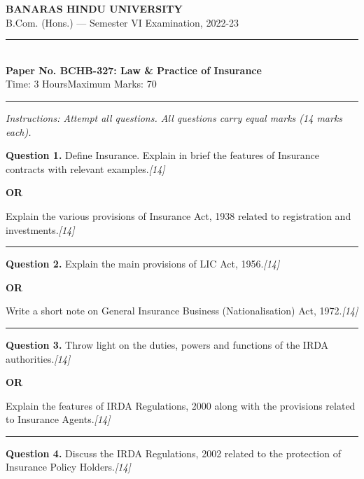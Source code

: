 \documentclass[11pt,a4paper]{article}
\newcommand{\pts}[1]{\hfill   \textit{[#1]}}
\begin{document}
\begin{center}
  {\large\bfseries BANARAS HINDU UNIVERSITY}\\[2pt]
  {\normalsize B.Com. (Hons.) --- Semester VI Examination, 2022-23}\\[6pt]
  \rule{0.8\linewidth}{0.5pt}\\[6pt]
  {\large\bfseries Paper No. BCHB-327: Law \& Practice of Insurance}\\[4pt]
  {\normalsize Time: 3 Hours\hfill Maximum Marks: 70}
\end{center}

\rule{\linewidth}{0.4pt}

\smallskip



\noindent   \textit{Instructions: Attempt all questions. All questions carry equal marks (14 marks each).}

\bigskip




\noindent   \textbf{Question 1.}
Define Insurance. Explain in brief the features of Insurance contracts with relevant examples.\pts{14}

\centerline{   \textbf{OR}}

Explain the various provisions of Insurance Act, 1938 related to registration and investments.\pts{14}

\medskip\rule{\linewidth}{0.2pt}




\noindent   \textbf{Question 2.}
Explain the main provisions of LIC Act, 1956.\pts{14}

\centerline{   \textbf{OR}}

Write a short note on General Insurance Business (Nationalisation) Act, 1972.\pts{14}

\medskip\rule{\linewidth}{0.2pt}




\noindent   \textbf{Question 3.}
Throw light on the duties, powers and functions of the IRDA authorities.\pts{14}

\centerline{   \textbf{OR}}

Explain the features of IRDA Regulations, 2000 along with the provisions related to Insurance Agents.\pts{14}

\medskip\rule{\linewidth}{0.2pt}




\noindent   \textbf{Question 4.}
Discuss the IRDA Regulations, 2002 related to the protection of Insurance Policy Holders.\pts{14}
\end{document}
